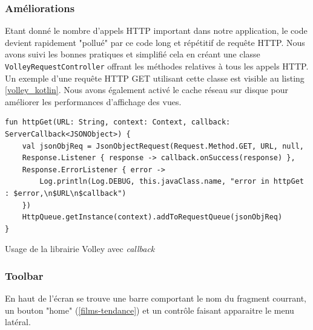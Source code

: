 \subsubsection{Améliorations}
Etant donné le nombre d'appels HTTP important dans notre application, le code devient rapidement "pollué" par ce code long et répétitif de requête HTTP. Nous avons suivi les bonnes pratiques et simplifié cela en créant une classe \texttt{VolleyRequestController} offrant les méthodes relatives à tous les appels HTTP. Un exemple d'une requête HTTP GET utilisant cette classe est visible au listing \ref{volley_kotlin}. Nous avons également activé le cache réseau sur disque pour améliorer les performances d'affichage des vues.
\bigbreak
\begin{code}
    \begin{verbatim}
fun httpGet(URL: String, context: Context, callback: ServerCallback<JSONObject>) {
    val jsonObjReq = JsonObjectRequest(Request.Method.GET, URL, null,
    Response.Listener { response -> callback.onSuccess(response) },
    Response.ErrorListener { error ->
        Log.println(Log.DEBUG, this.javaClass.name, "error in httpGet : $error,\n$URL\n$callback")
    })
    HttpQueue.getInstance(context).addToRequestQueue(jsonObjReq)
}
    \end{verbatim}
    \caption{Usage de la librairie Volley avec \textit{callback}}
    \label{volley_kotlin}
\end{code}
\bigbreak

\subsubsection{Toolbar}
En haut de l'écran se trouve une barre comportant le nom du fragment courrant, un bouton "home" (\ref{films-tendance}) et un contrôle faisant apparaitre le menu latéral.


